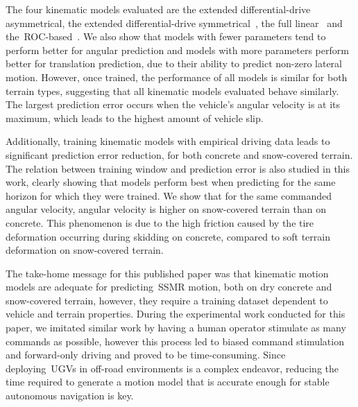 \documentclass[12pt,letterpaper,oneside]{article}
\begin{document}
The four kinematic models evaluated are the extended differential-drive asymmetrical, the extended differential-drive symmetrical~\citep{Mandow2007}, the full linear~\citep{Anousaki2004} and the~\ac{ROC}-based~\citep{Wang2015}.
We also show that models with fewer parameters tend to perform better for angular prediction and models with more parameters perform better for translation prediction, due to their ability to predict non-zero lateral motion.
However, once trained, the performance of all models is similar for both terrain types, suggesting that all kinematic models evaluated behave similarly.
The largest prediction error occurs when the vehicle's angular velocity is at its maximum, which leads to the highest amount of vehicle slip.

Additionally, training kinematic models with empirical driving data leads to significant prediction error reduction, for both concrete and snow-covered terrain.
The relation between training window and prediction error is also studied in this work, clearly showing that models perform best when predicting for the same horizon for which they were trained.
We show that for the same commanded angular velocity, angular velocity is higher on snow-covered terrain than on concrete. 
This phenomenon is due to the high friction caused by the tire deformation occurring during skidding on concrete, compared to soft terrain deformation on snow-covered terrain.

The take-home message for this published paper was that kinematic motion models are adequate for predicting~\ac{SSMR} motion, both on dry concrete and snow-covered terrain, however, they require a training dataset dependent to vehicle and terrain properties.
During the experimental work conducted for this paper, we imitated similar work by having a human operator stimulate as many commands as possible, however this process led to biased command stimulation and forward-only driving and proved to be time-consuming.
Since deploying~\acp{UGV} in off-road environments is a complex endeavor, reducing the time required to generate a motion model that is accurate enough for stable autonomous navigation is key.

\begin{center}
	\textbf{} %
\end{center}
\end{document}
